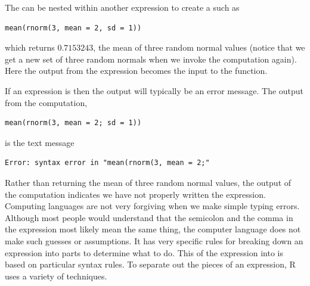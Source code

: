 The   can be
nested within another expression to create a 
such as
\begin{verbatim}
mean(rnorm(3, mean = 2, sd = 1))
\end{verbatim}
which returns $0.7153243$, the mean of three random normal values
(notice that we get a new set of three random normals when we invoke
the  computation again).  Here the output from the 
expression becomes the input to the  function.

If an expression is  then the output will typically be
an error message.  The output from the computation,
\begin{verbatim}
mean(rnorm(3, mean = 2; sd = 1))
\end{verbatim} 
is the text message
\begin{verbatim}
Error: syntax error in "mean(rnorm(3, mean = 2;"
\end{verbatim}
Rather than returning the mean of three random normal values, the
output of the computation indicates we have not properly written the
expression.  Computing languages are not very forgiving when we make simple
typing errors.  Although most people would understand that the
semicolon and the comma in the expression most likely mean the same
thing, the computer language does not make such guesses or
assumptions.  It has very specific rules for breaking down an
expression into parts to determine what to do.  This  of
the expression into  is based on particular syntax
rules. To separate out the pieces of an expression, R uses a variety
of techniques.


